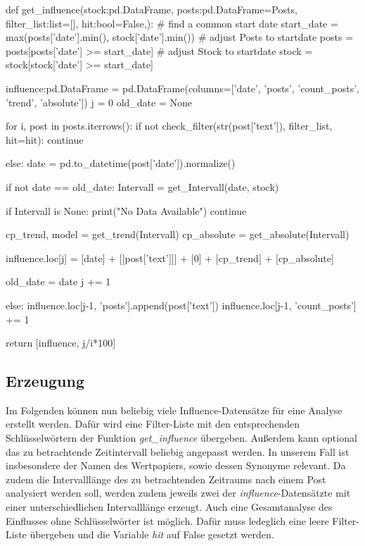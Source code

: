 \documentclass{article}
\begin{document}
\begin{python}
def get_influence(stock:pd.DataFrame, posts:pd.DataFrame=Posts, filter_list:list=[], hit:bool=False,):
    # find a common start date
    start_date = max(posts['date'].min(), stock['date'].min())
    # adjust Posts to startdate
    posts = posts[posts['date'] >= start_date]
    # adjust Stock to startdate
    stock = stock[stock['date'] >= start_date]

    influence:pd.DataFrame = pd.DataFrame(columns=['date', 'posts', 'count_posts', 'trend', 'absolute'])
    j = 0
    old_date = None

    for i, post in posts.iterrows():
        if not check_filter(str(post['text']), filter_list, hit=hit):
            continue

        else:
            date = pd.to_datetime(post['date']).normalize()

            if not date == old_date:
                Intervall = get_Intervall(date, stock)

                if Intervall is None:
                    print("No Data Available")
                    continue

                cp_trend, model = get_trend(Intervall)
                cp_absolute = get_absolute(Intervall)

                influence.loc[j] = [date] + [[post['text']]] + [0] + [cp_trend] + [cp_absolute]

                old_date = date
                j += 1

            else:
                influence.loc[j-1, 'posts'].append(post['text'])
                influence.loc[j-1, 'count_posts'] += 1

    return [influence, j/i*100]
\end{python}



\subsection{Erzeugung} \label{Erzeugung}
Im Folgenden können nun beliebig viele Influence-Datensätze für eine Analyse erstellt werden.
Dafür wird eine Filter-Liste mit den entsprechenden Schlüsselwörtern der Funktion \textit{get\_influence} übergeben.
Außerdem kann optional das zu betrachtende Zeitintervall beliebig angepasst werden.
In unserem Fall ist insbesondere der Namen des Wertpapiers, sowie dessen Synonyme relevant.
Da zudem die Intervalllänge des zu betrachtenden Zeitraums nach einem Post analysiert werden soll, werden zudem jeweils zwei der \textit{influence}-Datensätzte mit einer unterschiedlichen Intervalllänge erzeugt.
Auch eine Gesamtanalyse des Einflusses ohne Schlüsselwörter ist möglich.
Dafür muss ledeglich eine leere Filter-Liste übergeben und die Variable \textit{hit} auf False gesetzt werden.
\end{document}
